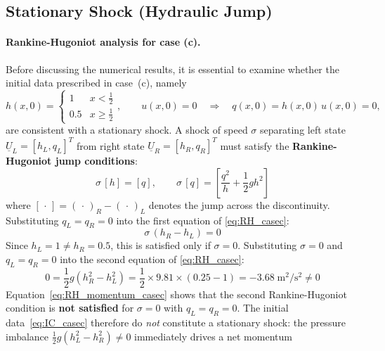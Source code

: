 \subsection{Stationary Shock (Hydraulic Jump)}
\label{ssc:322}

\paragraph{Rankine-Hugoniot analysis for case (c).}
Before discussing the numerical results, it is essential to examine whether 
the initial data prescribed in case~(c), namely
%
\begin{equation}
    h(x,0) = \begin{cases} 1 & x < \tfrac{1}{2} \\ 0.5 & x \geq \tfrac{1}{2} 
    \end{cases},
    \qquad u(x,0) = 0 
    \quad \Longrightarrow \quad 
    q(x,0) = h(x,0)\,u(x,0) = 0,
    \label{eq:IC_casec}
\end{equation}
%
are consistent with a stationary shock. A shock of speed $\sigma$ 
separating left state $\underline{U}_L = [h_L, q_L]^T$ from right state 
$\underline{U}_R = [h_R, q_R]^T$ must satisfy the 
\textbf{Rankine-Hugoniot jump conditions}:
%
\begin{equation}
    \sigma\,[h] = [q], 
    \qquad 
    \sigma\,[q] = \left[\frac{q^2}{h} + \frac{1}{2}gh^2\right]
    \label{eq:RH_casec}
\end{equation}
%
where $[\,\cdot\,] = (\,\cdot\,)_R - (\,\cdot\,)_L$ denotes the jump 
across the discontinuity. Substituting $q_L = q_R = 0$ into the first 
equation of \eqref{eq:RH_casec}:
%
\begin{equation}
    \sigma\,(h_R - h_L) = 0
\end{equation}
%
Since $h_L = 1 \neq h_R = 0.5$, this is satisfied only if $\sigma = 0$.
Substituting $\sigma = 0$ and $q_L = q_R = 0$ into the second equation 
of \eqref{eq:RH_casec}:
%
\begin{equation}
    0 = \frac{1}{2}g\!\left(h_R^2 - h_L^2\right) 
      = \frac{1}{2}\times 9.81 \times (0.25 - 1) 
      = -3.68\;\mathrm{m^2/s^2} \neq 0
    \label{eq:RH_momentum_casec}
\end{equation}
%
Equation~\eqref{eq:RH_momentum_casec} shows that the second 
Rankine-Hugoniot condition is \textbf{not satisfied} for $\sigma = 0$ 
with $q_L = q_R = 0$. The initial data~\eqref{eq:IC_casec} therefore 
do \emph{not} constitute a stationary shock: the pressure imbalance 
$\tfrac{1}{2}g(h_L^2 - h_R^2) \neq 0$ immediately drives a net momentum 
